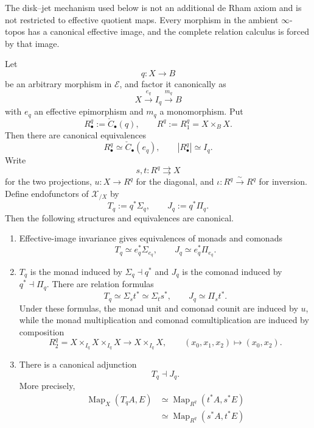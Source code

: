 The disk--jet mechanism used below is not an additional de Rham axiom and is
not restricted to effective quotient maps.  Every morphism in the ambient
$\infty$-topos has a canonical effective image, and the complete relation
calculus is forced by that image.

\begin{theorem}
\label{thm:effective-relation-calculus}
Let
\[
    q:X\longrightarrow B
\]
be an arbitrary morphism in $\mathcal E$, and factor it canonically as
\[
    X
    \xrightarrow{e_q}
    I_q
    \xrightarrow{m_q}
    B
\]
with $e_q$ an effective epimorphism and $m_q$ a monomorphism.  Put
\[
    R^q_\bullet:=\check C_\bullet(q),
    \qquad
    R^q:=R^q_1=X\times_BX.
\]
Then there are canonical equivalences
\[
    R^q_\bullet
    \simeq
    \check C_\bullet(e_q),
    \qquad
    |R^q_\bullet|\simeq I_q.
\]
Write
\[
    s,t:R^q\rightrightarrows X
\]
for the two projections, $u:X\to R^q$ for the diagonal, and
$\iota:R^q\xrightarrow{\sim}R^q$ for inversion.  Define endofunctors of
$\mathcal X_{/X}$ by
\[
    T_q:=q^*\Sigma_q,
    \qquad
    J_q:=q^*\Pi_q.
\]
Then the following structures and equivalences are canonical.
\begin{enumerate}
    \item Effective-image invariance gives equivalences of monads and comonads
    \[
        T_q\simeq e_q^*\Sigma_{e_q},
        \qquad
        J_q\simeq e_q^*\Pi_{e_q}.
    \]
    \item $T_q$ is the monad induced by $\Sigma_q\dashv q^*$ and $J_q$ is
    the comonad induced by $q^*\dashv\Pi_q$.  There are relation formulas
    \[
        T_q\simeq\Sigma_s t^*
        \simeq\Sigma_t s^*,
        \qquad
        J_q\simeq\Pi_s t^*.
    \]
    Under these formulas, the monad unit and comonad counit are induced by
    $u$, while the monad multiplication and comonad comultiplication are
    induced by composition
    \[
        R^q_2
        =
        X\times_{I_q}X\times_{I_q}X
        \longrightarrow
        X\times_{I_q}X,
        \qquad
        (x_0,x_1,x_2)\longmapsto(x_0,x_2).
    \]
    \item There is a canonical adjunction
    \[
        T_q\dashv J_q.
    \]
    More precisely,
    \[
    \begin{aligned}
        \operatorname{Map}_X(T_qA,E)
        &\simeq
        \operatorname{Map}_{R^q}(t^*A,s^*E)\\
        &\simeq
        \operatorname{Map}_{R^q}(s^*A,t^*E)\\

\end{aligned}\]
\end{enumerate}
\end{theorem}

